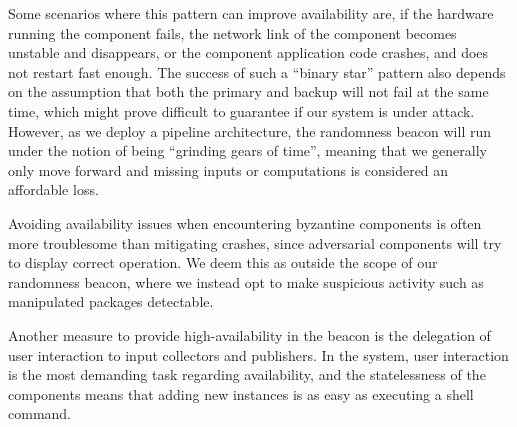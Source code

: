 Some scenarios where this pattern can improve availability are, if the hardware running the component fails, the network link of the component becomes unstable and disappears, or the component application code crashes, and does not restart fast enough.
The success of such a \enquote{binary star} pattern also depends on the assumption that both the primary and backup will not fail at the same time, which might prove difficult to guarantee if our system is under attack.
However, as we deploy a pipeline architecture, the randomness beacon will run under the notion of being \enquote{grinding gears of time}, meaning that we generally only move forward and missing inputs or computations is considered an affordable loss.

Avoiding availability issues when encountering byzantine components is often more troublesome than mitigating crashes, since adversarial components will try to display correct operation.
We deem this as outside the scope of our randomness beacon, where we instead opt to make suspicious activity such as manipulated packages detectable.

Another measure to provide high-availability in the beacon is the delegation of user interaction to input collectors and publishers.
In the system, user interaction is the most demanding task regarding availability, and the statelessness of the components means that adding new instances is as easy as executing a shell command.
